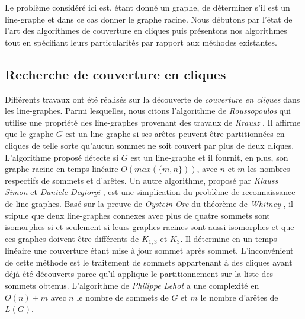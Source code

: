 

Le probl\`eme consid\'er\'e ici est, 
\'etant donn\'e un graphe, de d\'eterminer s'il est un line-graphe et dans ce cas donner le graphe racine.
Nous d\'ebutons par l'\'etat de l'art des algorithmes de couverture en cliques puis pr\'esentons nos algorithmes tout en sp\'ecifiant leurs particularit\'es par rapport aux m\'ethodes existantes. 

\subsection{Recherche de couverture en cliques}
Diff\'erents travaux ont \'et\'e r\'ealis\'es sur la d\'ecouverte de {\em couverture en cliques} dans les line-graphes.
Parmi lesquelles, nous citons  l'algorithme de {\em Roussopoulos}  \cite{ROUSSOPOULOS1973108} qui utilise une propri\'et\'e des line-graphes provenant des travaux de {\em Krausz} \cite{krausz1943demonstration}. 
Il affirme que le graphe $G$ est un line-graphe si ses ar\^etes  peuvent \^etre partitionn\'ees en cliques  de telle sorte qu'aucun sommet ne soit couvert par plus de deux cliques. 
L'algorithme propos\'e d\'etecte si $G$ est un line-graphe et il fournit, en plus, son graphe racine en temps lin\'eaire $O(max(\{m,n\}))$, avec $n$ et $m$ les nombres respectifs de sommets et d'ar\^etes.
\newline
Un autre algorithme, propos\'e par {\em Klauss Simon} et {\em Daniele Degiorgi} \cite{decompositionEnCliques}, est une simplication du probl\`eme de reconnaissance de line-graphes. Bas\'e sur la preuve de {\em Oystein Ore} du th\'eor\`eme de {\em Whitney} \cite{whitney1932congruent}, il stipule que deux line-graphes connexes avec plus de quatre sommets sont isomorphes si et seulement si leurs graphes racines sont aussi isomorphes et que ces graphes  doivent \^etre diff\'erents de $K_{1,3}$ et $K_3$. Il d\'etermine en un temps lin\'eaire une couverture \'etant mise \`a jour sommet apr\`es sommet. 
L'inconv\'enient de cette m\'ethode est le traitement de sommets appartenant \`a des cliques ayant d\'ej\`a \'et\'e d\'ecouverts parce qu'il applique le partitionnement sur la liste des sommets obtenus.
\newline
L'algorithme de {\em Philippe Lehot} \cite{decompositionEnCliquesParArcs} a une complexit\'e en $O(n) + m$ avec $n$ le nombre de sommets de $G$ et $m$ le nombre d'ar\^etes de $L(G)$.
